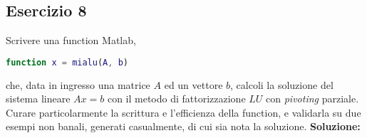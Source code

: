\subsection{Esercizio 8}
Scrivere una function Matlab,
\begin{lstlisting}[language=Matlab]
function x = mialu(A, b)
\end{lstlisting}
che, data in ingresso una matrice $A$ ed un vettore $b$, calcoli la soluzione
del sistema lineare $Ax = b$ con il metodo di fattorizzazione $LU$ con \textit{pivoting} parziale.
Curare particolarmente la scrittura e l'efficienza della function,
e validarla su due esempi non banali, generati casualmente,
di cui sia nota la soluzione.
\newline \textbf{Soluzione:} \newline
